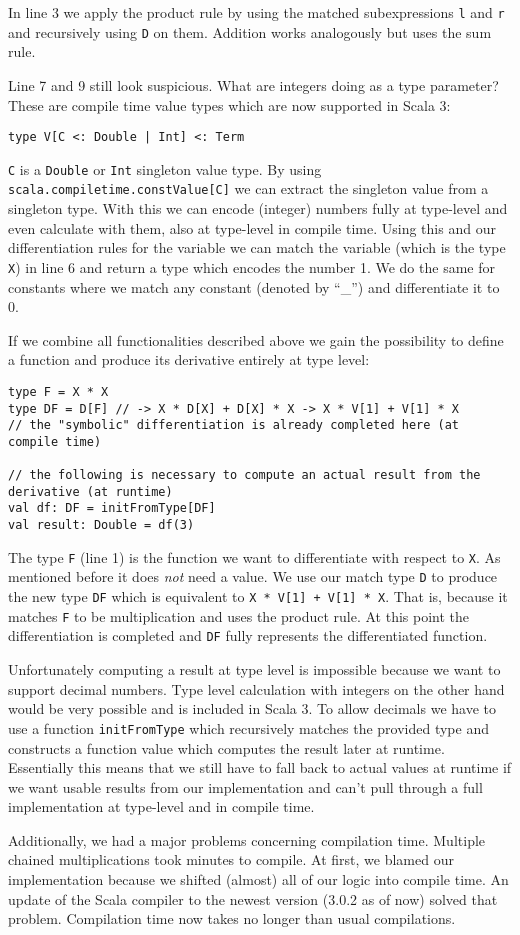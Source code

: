 In line 3 we apply the product rule by using the matched subexpressions \lstinline{l} and \lstinline{r} and recursively using \lstinline{D} on them. Addition works analogously but uses the sum rule.

Line 7 and 9 still look suspicious. What are integers doing as a type parameter? These are compile time value types which are now supported in Scala 3:
\begin{lstlisting}
type V[C <: Double | Int] <: Term
\end{lstlisting}
\lstinline{C} is a \lstinline{Double} or \lstinline{Int} singleton value type. By using \lstinline{scala.compiletime.constValue[C]} we can extract the singleton value from a singleton type. With this we can encode (integer) numbers fully at type-level and even calculate with them, also at type-level in compile time. Using this and our differentiation rules for the variable we can match the variable (which is the type \lstinline{X}) in line 6 and return a type which encodes the number 1. We do the same for constants where we match any constant (denoted by ``\_'') and differentiate it to 0.

If we combine all functionalities described above we gain the possibility to define a function and produce its derivative entirely at type level:
\begin{lstlisting}
type F = X * X
type DF = D[F] // -> X * D[X] + D[X] * X -> X * V[1] + V[1] * X
// the "symbolic" differentiation is already completed here (at compile time)

// the following is necessary to compute an actual result from the derivative (at runtime)
val df: DF = initFromType[DF] 
val result: Double = df(3)
\end{lstlisting}
The type \lstinline{F} (line 1) is the function we want to differentiate with respect to \lstinline{X}. As mentioned before it does \emph{not} need a value. We use our match type \lstinline{D} to produce the new type \lstinline{DF} which is equivalent to \lstinline{X * V[1] + V[1] * X}. That is, because it matches \lstinline{F} to be multiplication and uses the product rule. At this point the differentiation is completed and \lstinline{DF} fully represents the differentiated function.

Unfortunately computing a result at type level is impossible because we want to support decimal numbers. Type level calculation with integers on the other hand would be very possible and is included in Scala 3. To allow decimals we have to use a function \lstinline{initFromType} which recursively matches the provided type and constructs a function value which computes the result later at runtime. Essentially this means that we still have to fall back to actual values at runtime if we want usable results from our implementation and can't pull through a full implementation at type-level and in compile time.

Additionally, we had a major problems concerning compilation time. Multiple chained multiplications took minutes to compile. At first, we blamed our implementation because we shifted (almost) all of our logic into compile time. An update of the Scala compiler to the newest version (3.0.2 as of now) solved that problem. Compilation time now takes no longer than usual compilations.
